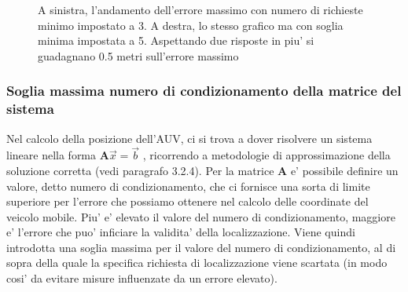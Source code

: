 \documentclass[Lau,binding=0.6cm]{sapthesis}
\begin{document}
\begin{figure}[H]
    \centering
    \hfill
    \caption{A sinistra, l'andamento dell'errore massimo con numero di richieste minimo impostato a 3. A destra, lo stesso grafico ma con soglia minima impostata a 5. Aspettando due risposte in piu' si guadagnano 0.5 metri sull'errore massimo}
\end{figure}
\subsubsection{Soglia massima numero di condizionamento della matrice del sistema}
\par
Nel calcolo della posizione dell'AUV, ci si trova a dover risolvere un sistema lineare nella forma  \(\textbf{A}\overrightarrow{x} = \overrightarrow{b} \) , ricorrendo a metodologie di approssimazione della soluzione corretta (vedi paragrafo 3.2.4). Per la matrice \(\textbf{A}\) e' possibile definire un valore, detto numero di condizionamento, che ci fornisce una sorta di limite superiore  per l'errore che possiamo ottenere nel calcolo delle coordinate del veicolo mobile. Piu' e' elevato il valore del numero di condizionamento, maggiore e' l'errore che puo' inficiare la validita' della localizzazione. Viene quindi introdotta una soglia massima per il valore del numero di condizionamento, al di sopra della quale la specifica richiesta di localizzazione viene scartata (in modo cosi' da evitare misure influenzate da un errore elevato).
\end{document}
